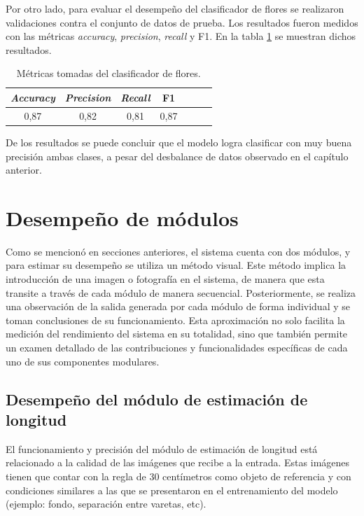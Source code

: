 Por otro lado, para evaluar el desempeño del clasificador de flores se realizaron validaciones contra el conjunto de datos de prueba. Los resultados fueron medidos con las métricas \textit{accuracy}, \textit{precision}, \textit{recall} y F1. En la tabla \ref{tab:resultadosClass007} se muestran dichos resultados.

\begin{table}[h]
	\centering
	\caption{Métricas tomadas del clasificador de flores.}
	\begin{tabular}{c c c c c c c}    
		\toprule
		\textbf{\textit{Accuracy}}&\textbf{\textit{Precision}}&\textbf{\textit{Recall}}&\textbf{F1}\\
		\midrule
		0,87 & 0,82 & 0,81 & 0,87\\		
		\bottomrule
		\hline
	\end{tabular}
	\label{tab:resultadosClass007}
\end{table}
\newpage
De los resultados se puede concluir que el modelo logra clasificar con muy buena precisión ambas clases, a pesar del desbalance de datos observado en el capítulo anterior.

\section{Desempeño de módulos}
\label{sec:desempeñoModulos}

Como se mencionó en secciones anteriores, el sistema cuenta con dos módulos, y para estimar su desempeño se utiliza un método visual. Este método implica la introducción de una imagen o fotografía en el sistema, de manera que esta transite a través de cada módulo de manera secuencial. Posteriormente, se realiza una observación de la salida generada por cada módulo de forma individual y se toman conclusiones de su funcionamiento. Esta aproximación no solo facilita la medición del rendimiento del sistema en su totalidad, sino que también permite un examen detallado de las contribuciones y funcionalidades específicas de cada uno de sus componentes modulares.

\subsection{Desempeño del módulo de estimación de longitud}

El funcionamiento y precisión del módulo de estimación de longitud está relacionado a la calidad de las imágenes que recibe a la entrada. Estas imágenes tienen que contar con la regla de 30 centímetros como objeto de referencia y con condiciones similares a las que se presentaron en el entrenamiento del modelo (ejemplo: fondo, separación entre varetas, etc).

